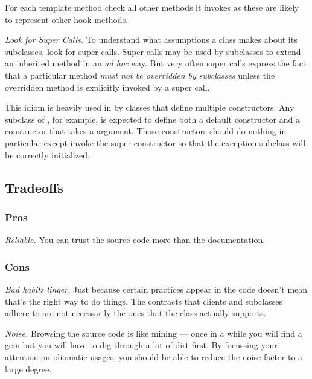 \documentclass[a4paper,10pt,twoside]{book}
\begin{document}
For each template method check all other methods it invokes as these are likely to represent other hook methods.

\noindent
\emph{Look for Super Calls.}
To understand what assumptions a class makes about its subclasses, look for super calls. Super calls may be used by subclasses to extend an inherited method in an \emph{ad hoc} way. But very often super calls express the fact that a particular method \emph{must not be overridden by subclasses} unless the overridden method is explicitly invoked by a super call.

This idiom is heavily used in  by classes that define multiple constructors. Any subclass of , for example, is expected to define both a default constructor and a constructor that takes a  argument. Those constructors should do nothing in particular except invoke the super constructor so that the exception subclass will be correctly initialized.

\subsection*{Tradeoffs}

\subsubsection*{Pros}

\begin{bulletlist}
\item \emph{Reliable.}
You can trust the source code more than the documentation.
\end{bulletlist}

\subsubsection*{Cons}

\begin{bulletlist}
\item \emph{Bad habits linger.}
Just because certain practices appear in the code doesn't mean that's the right way to do things. The contracts that clients and subclasses adhere to are not necessarily the ones that the class actually supports.

\item \emph{Noise.}
Browsing the source code is like mining --- once in a while you will find a gem but you will have to dig through a lot of dirt first. By focussing your attention on idiomatic usages, you should be able to reduce the noise factor to a large degree.
\end{bulletlist}
\end{document}
